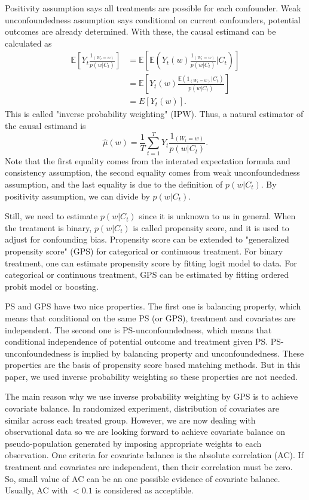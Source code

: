 \documentclass[12pt]{article}
\begin{document}
Positivity assumption says all treatments are possible for each confounder.
Weak unconfoundedness assumption says
conditional on current confounders, potential outcomes are already determined.
With these, the causal estimand can be calculated as
\[
	\begin{split}
		\mathbb{E}\left[ Y_t\frac{1_{(W_t = w)}}{p(w\lvert C_t)} \right]
		& = \mathbb{E}\left[ \mathbb{E}\left( Y_t(w) \frac{1_{(W_t = w)}}{p(w\lvert C_t)} \lvert C_t\right)\right]\\
		& = \mathbb{E}\left[ Y_t(w)\frac{\mathbb{E}\left( 1_{(W_t = w)}\lvert C_t \right)}{p(w\lvert C_t)} \right]\\
		& = E\left[ Y_t(w) \right].
	\end{split}
\]
This is called "inverse probability weighting" (IPW).
Thus, a natural estimator of the causal estimand is
\[
	\hat{\mu}(w) = \frac{1}{T}\sum_{t = 1}^T Y_t \frac{1_{(W_t = w)}}{p(w\lvert C_t)}.	
\]
Note that the first equality comes from the interated expectation formula and consistency assumption,
the second equality comes from weak unconfoundedness assumption,
and the last equality is due to the definition of $p(w\lvert C_t)$.
By positivity assumption, we can divide by $p(w\lvert C_t)$.

Still, we need to estimate $p(w\lvert C_t)$ since it is unknown to us in general.
When the treatment is binary, $p(w\lvert C_t)$ is called propensity score,
and it is used to adjust for confounding bias\cite{rosenbaum1983}.
Propensity score can be extended to 
"generalized propensity score" (GPS) for categorical or continuous treatment\cite{imbens2000}.
For binary treatment, one can estimate propensity score by fitting logit model to data.
For categorical or continuous treatment, GPS can be estimated by fitting ordered probit model or boosting.

PS and GPS have two nice properties\cite{rosenbaum1983, hirano2004}.
The first one is balancing property, which means that conditional on the same PS (or GPS),
treatment and covariates are independent.
The second one is PS-unconfoundedness, 
which means that conditional independence of potential outcome and treatment given PS.
PS-unconfoundedness is implied by balancing property and unconfoundedness.
These properties are the basis of propensity score based matching methods.
But in this paper, we used inverse probability weighting so these properties are not needed.

The main reason why we use inverse probability weighting by GPS is to achieve covariate balance.
In randomized experiment, distribution of covariates are similar across each treated group.
However, we are now dealing with observational data 
so we are looking forward to achieve covariate balance on pseudo-population generated by
imposing appropriate weights to each observation.
One criteria for covariate balance is the absolute correlation (AC)\cite{gpsboosting2015}.
If treatment and covariates are independent, then their correlation must be zero.
So, small value of AC can be an one possible evidence of covariate balance.
Usually, AC with $ <0.1 $ is considered as acceptible.
\end{document}
